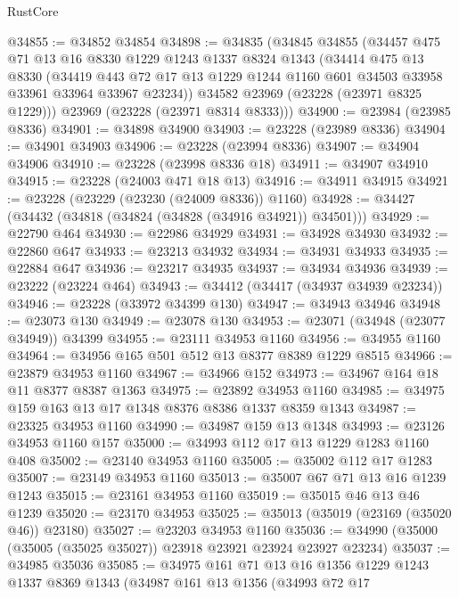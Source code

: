 \begin{lexlean}{RustCore}
\begin{coremodule}
@34855 := @34852 @34854
@34898 := @34835
    (@34845
      @34855
      (@34457
        @475
        @71
        @13
        @16
        @8330
        @1229
        @1243
        @1337
        @8324
        @1343
        (@34414
          @475
          @13
          @8330
          (@34419
            @443
            @72
            @17
            @13
            @1229
            @1244
            @1160
            @601
            @34503
            @33958
            @33961
            @33964
            @33967
            @23234))
        @34582
        @23969
        (@23228 (@23971 @8325 @1229)))
      @23969
      (@23228 (@23971 @8314 @8333)))
@34900 := @23984 (@23985 @8336)
@34901 := @34898 @34900
@34903 := @23228 (@23989 @8336)
@34904 := @34901 @34903
@34906 := @23228 (@23994 @8336)
@34907 := @34904 @34906
@34910 := @23228 (@23998 @8336 @18)
@34911 := @34907 @34910
@34915 := @23228 (@24003 @471 @18 @13)
@34916 := @34911 @34915
@34921 := @23228 (@23229 (@23230 (@24009 @8336)) @1160)
@34928 := @34427 (@34432 (@34818 (@34824 (@34828 (@34916 @34921)) @34501)))
@34929 := @22790 @464
@34930 := @22986 @34929
@34931 := @34928 @34930
@34932 := @22860 @647
@34933 := @23213 @34932
@34934 := @34931 @34933
@34935 := @22884 @647
@34936 := @23217 @34935
@34937 := @34934 @34936
@34939 := @23222 (@23224 @464)
@34943 := @34412 (@34417 (@34937 @34939 @23234))
@34946 := @23228 (@33972 @34399 @130)
@34947 := @34943 @34946
@34948 := @23073 @130
@34949 := @23078 @130
@34953 := @23071 (@34948 (@23077 @34949)) @34399
@34955 := @23111 @34953 @1160
@34956 := @34955 @1160
@34964 := @34956 @165 @501 @512 @13 @8377 @8389 @1229 @8515
@34966 := @23879 @34953 @1160
@34967 := @34966 @152
@34973 := @34967 @164 @18 @11 @8377 @8387 @1363
@34975 := @23892 @34953 @1160
@34985 := @34975 @159 @163 @13 @17 @1348 @8376 @8386 @1337 @8359 @1343
@34987 := @23325 @34953 @1160
@34990 := @34987 @159 @13 @1348
@34993 := @23126 @34953 @1160 @157
@35000 := @34993 @112 @17 @13 @1229 @1283 @1160 @408
@35002 := @23140 @34953 @1160
@35005 := @35002 @112 @17 @1283
@35007 := @23149 @34953 @1160
@35013 := @35007 @67 @71 @13 @16 @1239 @1243
@35015 := @23161 @34953 @1160
@35019 := @35015 @46 @13 @46 @1239
@35020 := @23170 @34953
@35025 := @35013 (@35019 (@23169 (@35020 @46)) @23180)
@35027 := @23203 @34953 @1160
@35036 := @34990 (@35000 (@35005 (@35025 @35027)) @23918 @23921 @23924 @23927 @23234)
@35037 := @34985 @35036
@35085 := @34975
    @161
    @71
    @13
    @16
    @1356
    @1229
    @1243
    @1337
    @8369
    @1343
    (@34987
      @161
      @13
      @1356
      (@34993
        @72
        @17

\end{coremodule}
\end{lexlean}
